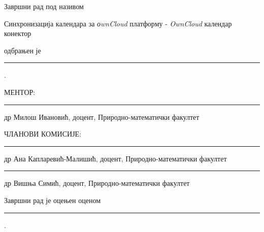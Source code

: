 \pagebreak

\thispagestyle{empty}





\vspace*{2cm}

Завршни рад под називом \vspace*{3mm}

 \centerline{Синхронизација календара за \textit{оwnCloud} платформу - \textit{OwnCloud} календар конектор} 
\vspace*{3mm}

\noindent одбрањен је \rule{3cm}{0.5pt}.
\vspace*{2cm}


\noindent МЕНТОР:
\vspace*{1cm}

\noindent \rule{10cm}{0.5pt}

\noindent др Милош Ивановић, доцент, Природно-математички факултет
\vspace*{2cm}

 

{\phantom{a}\hfill ЧЛАНОВИ
КОМИСИЈЕ:\qquad\qquad\qquad}
\vspace*{1cm}

\noindent\hspace*{2cm}\rule{10cm}{0.5pt}

\noindent\hspace*{2cm} др Ана Капларевић-Малишић, доцент, Природно-математички факултет
\vspace*{1cm}

\noindent\hspace*{2cm}\rule{10cm}{0.5pt}

\noindent\hspace*{2cm} др Вишња Симић, доцент, Природно-математички факултет

\vspace*{2cm}

Завршни рад је оцењен оценом \rule{3cm}{0.5pt}.
